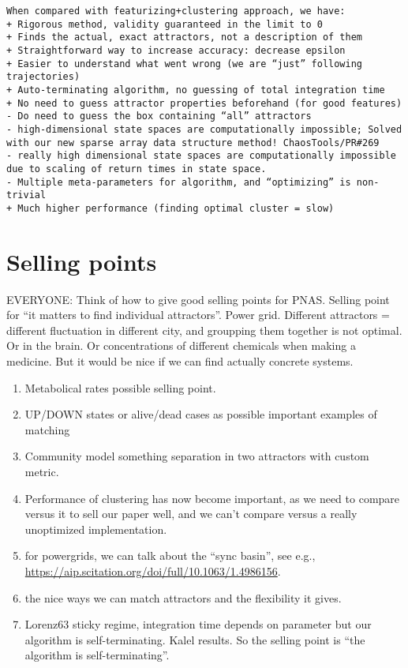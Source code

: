 \documentclass{article}
\newcommand{\kalel}[1]{\textcolor{OliveGreen}{#1}}
\begin{document}
\begin{verbatim}
When compared with featurizing+clustering approach, we have:
+ Rigorous method, validity guaranteed in the limit to 0
+ Finds the actual, exact attractors, not a description of them
+ Straightforward way to increase accuracy: decrease epsilon
+ Easier to understand what went wrong (we are “just” following trajectories)
+ Auto-terminating algorithm, no guessing of total integration time
+ No need to guess attractor properties beforehand (for good features)
- Do need to guess the box containing “all” attractors
- high-dimensional state spaces are computationally impossible; Solved with our new sparse array data structure method! ChaosTools/PR#269
- really high dimensional state spaces are computationally impossible due to scaling of return times in state space.
- Multiple meta-parameters for algorithm, and “optimizing” is non-trivial
+ Much higher performance (finding optimal cluster = slow)
\end{verbatim}

\section{Selling points}
EVERYONE: Think of how to give good selling points for PNAS.
Selling point for ``it matters to find individual attractors''. Power grid. Different attractors = different fluctuation in different city, and groupping them together is not optimal. Or in the brain. Or concentrations of different chemicals when making a medicine. But it would be nice if we can find actually concrete systems.

\begin{enumerate} 
\item \kalel{Metabolical rates possible selling point.}
\item \kalel{UP/DOWN states or alive/dead cases as possible important examples of matching}
\item \kalel{Community model something separation in two attractors with custom metric.}
\item \kalel{Performance of clustering has now become important, as we need to compare versus it to sell our paper well, and we can't compare versus a really unoptimized implementation.}
\item for powergrids, we can talk about the ``sync basin'', see e.g., \url{https://aip.scitation.org/doi/full/10.1063/1.4986156}.
\item the nice ways we can match attractors and the flexibility it gives.
    \item Lorenz63 sticky regime, integration time depends on parameter but our algorithm is self-terminating. Kalel results. So the selling point is ``the algorithm is self-terminating''.
\end{enumerate}
\end{document}
